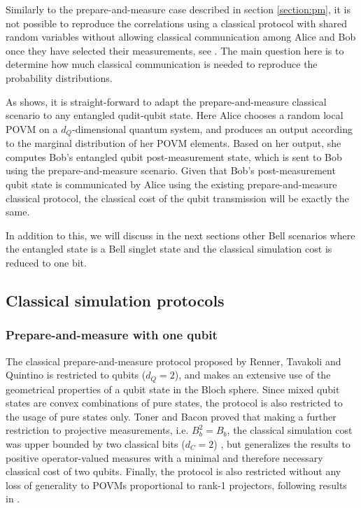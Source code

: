 Similarly to the prepare-and-measure case described in section \ref{section:pm}, it is not possible to reproduce the correlations using a classical protocol with shared random variables without allowing classical communication among Alice and Bob once they have selected their measurements, see \cite{bell1964}. The main question here is to determine how much classical communication is needed to reproduce the probability distributions.

As \cite{renner2022} shows, it is straight-forward to adapt the prepare-and-measure classical scenario to any entangled qudit-qubit state. Here Alice chooses a random local POVM on a $d_Q$-dimensional quantum system, and produces an output according to the marginal distribution of her POVM elements. Based on her output, she computes Bob's entangled qubit post-measurement state, which is sent to Bob using the prepare-and-measure scenario. Given that Bob's post-measurement qubit state is communicated by Alice using the existing prepare-and-measure classical protocol, the classical cost of the qubit transmission will be exactly the same. 

In addition to this, we will discuss in the next sections other Bell scenarios where the entangled state is a Bell singlet state and the classical simulation cost is reduced to one bit.


\subsection{Classical simulation protocols}
\subsubsection{Prepare-and-measure with one qubit}\label{section:protocol_pm}
The classical prepare-and-measure protocol proposed by Renner, Tavakoli and Quintino \cite{renner2022} is restricted to qubits ($d_Q=2$), and makes an extensive use of the geometrical properties of a qubit state in the Bloch sphere. Since mixed qubit states are convex combinations of pure states, the protocol is also restricted to the usage of pure states only. Toner and Bacon proved that making a further restriction to projective measurements, i.e. $B_b^{2} = B_b$, the classical simulation cost was upper bounded by two classical bits ($d_C=2$) \cite{toner2003}, but \cite{renner2022} generalizes the results to positive operator-valued measures with a minimal and therefore necessary classical cost of two qubits. Finally, the protocol is also restricted without any loss of generality to POVMs proportional to rank-1 projectors, following results in \cite{barrett2002}.

